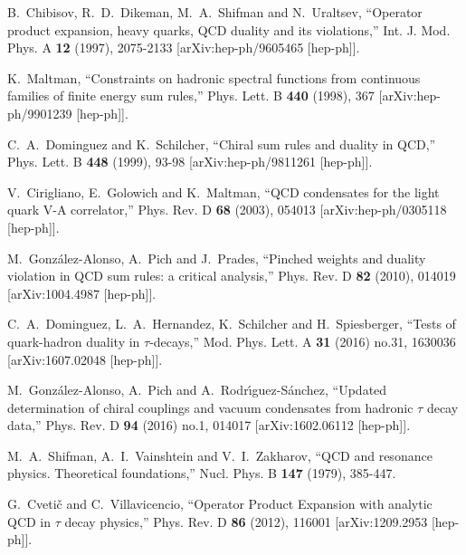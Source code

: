 \documentclass[aps,nofootinbib,showkeys,noshowpacs,preprintnumbers,amsmath,amssymb]{revtex4}
\begin{document}
\begin{thebibliography}{99}
B.~Chibisov, R.~D.~Dikeman, M.~A.~Shifman and N.~Uraltsev,
``Operator product expansion, heavy quarks, QCD duality and its violations,''
Int. J. Mod. Phys. A \textbf{12} (1997), 2075-2133
[arXiv:hep-ph/9605465 [hep-ph]].

K.~Maltman,
``Constraints on hadronic spectral functions from continuous families of finite energy sum rules,''
Phys. Lett. B \textbf{440} (1998), 367
[arXiv:hep-ph/9901239 [hep-ph]].  

C.~A.~Dominguez and K.~Schilcher,
``Chiral sum rules and duality in QCD,''
Phys. Lett. B \textbf{448} (1999), 93-98
[arXiv:hep-ph/9811261 [hep-ph]].
  
V.~Cirigliano, E.~Golowich and K.~Maltman,
``QCD condensates for the light quark V-A correlator,''
Phys. Rev. D \textbf{68} (2003), 054013
[arXiv:hep-ph/0305118 [hep-ph]].


M.~Gonz\'alez-Alonso, A.~Pich and J.~Prades,
``Pinched weights and duality violation in QCD sum rules: a critical analysis,''
Phys. Rev. D \textbf{82} (2010), 014019
[arXiv:1004.4987 [hep-ph]].


C.~A.~Dominguez, L.~A.~Hernandez, K.~Schilcher and H.~Spiesberger,
``Tests of quark-hadron duality in $\tau$-decays,''
Mod. Phys. Lett. A \textbf{31} (2016) no.31, 1630036
[arXiv:1607.02048 [hep-ph]].

M.~Gonz\'alez-Alonso, A.~Pich and A.~Rodr\'\i{}guez-S\'anchez,
``Updated determination of chiral couplings and vacuum condensates from hadronic $\tau$ decay data,''
Phys. Rev. D \textbf{94} (2016) no.1, 014017
[arXiv:1602.06112 [hep-ph]].

M.~A.~Shifman, A.~I.~Vainshtein and V.~I.~Zakharov,
``QCD and resonance physics. Theoretical foundations,''
Nucl. Phys. B \textbf{147} (1979), 385-447.

G.~Cveti\v{c} and C.~Villavicencio,
``Operator Product Expansion with analytic QCD in $\tau$ decay physics,''
Phys. Rev. D \textbf{86} (2012), 116001
[arXiv:1209.2953 [hep-ph]].



\end{thebibliography}
\end{document}
